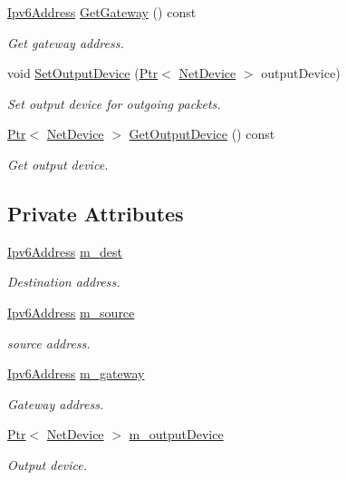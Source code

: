 \begin{DoxyCompactItemize}
\hyperlink{classns3_1_1Ipv6Address}{Ipv6\+Address} \hyperlink{classns3_1_1Ipv6Route_a24c0c43785b929c64d48f51f5b12f0ae}{Get\+Gateway} () const 
\begin{DoxyCompactList}\small\item\em Get gateway address. \end{DoxyCompactList}\item 
void \hyperlink{classns3_1_1Ipv6Route_ae6816378d05c62f67190b91028e0b565}{Set\+Output\+Device} (\hyperlink{classns3_1_1Ptr}{Ptr}$<$ \hyperlink{classns3_1_1NetDevice}{Net\+Device} $>$ output\+Device)
\begin{DoxyCompactList}\small\item\em Set output device for outgoing packets. \end{DoxyCompactList}\item 
\hyperlink{classns3_1_1Ptr}{Ptr}$<$ \hyperlink{classns3_1_1NetDevice}{Net\+Device} $>$ \hyperlink{classns3_1_1Ipv6Route_a7236b1ecdaa330b2d92f398898e695f1}{Get\+Output\+Device} () const 
\begin{DoxyCompactList}\small\item\em Get output device. \end{DoxyCompactList}\end{DoxyCompactItemize}
\subsection*{Private Attributes}
\begin{DoxyCompactItemize}
\item 
\hyperlink{classns3_1_1Ipv6Address}{Ipv6\+Address} \hyperlink{classns3_1_1Ipv6Route_a8b876e17fd74146673d776bf9bc29a2a}{m\+\_\+dest}
\begin{DoxyCompactList}\small\item\em Destination address. \end{DoxyCompactList}\item 
\hyperlink{classns3_1_1Ipv6Address}{Ipv6\+Address} \hyperlink{classns3_1_1Ipv6Route_a8b3683bd8c4337630df3a83c18a9fa38}{m\+\_\+source}
\begin{DoxyCompactList}\small\item\em source address. \end{DoxyCompactList}\item 
\hyperlink{classns3_1_1Ipv6Address}{Ipv6\+Address} \hyperlink{classns3_1_1Ipv6Route_aacbb70b8aa3ad323f8b5acd7f4148c89}{m\+\_\+gateway}
\begin{DoxyCompactList}\small\item\em Gateway address. \end{DoxyCompactList}\item 
\hyperlink{classns3_1_1Ptr}{Ptr}$<$ \hyperlink{classns3_1_1NetDevice}{Net\+Device} $>$ \hyperlink{classns3_1_1Ipv6Route_a7f0350e3877dbb3cd9bf7d628296c945}{m\+\_\+output\+Device}
\begin{DoxyCompactList}\small\item\em Output device. \end{DoxyCompactList}\end{DoxyCompactItemize}
